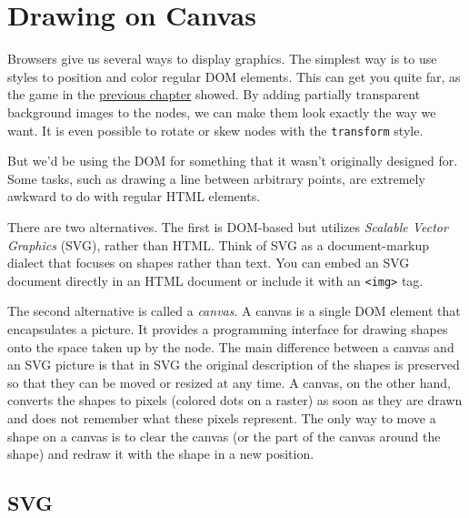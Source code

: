 \chapter{Drawing on Canvas}\label{canvas}


Browsers give us several ways to display graphics. The simplest way is to use styles to position and color regular DOM elements. This can get you quite far, as the game in the \hyperref[game]{previous chapter} showed. By adding partially transparent background images to the nodes, we can make them look exactly the way we want. It is even possible to rotate or skew nodes with the \lstinline`transform` style.

But we'd be using the DOM for something that it wasn't originally designed for. Some tasks, such as drawing a line between arbitrary points, are extremely awkward to do with regular HTML elements.

There are two alternatives. The first is DOM-based but utilizes \emph{Scalable Vector Graphics} (SVG), rather than HTML. Think of SVG as a document-markup dialect that focuses on shapes rather than text. You can embed an SVG document directly in an HTML document or include it with an \lstinline`<img>` tag.

The second alternative is called a \emph{canvas}. A canvas is a single DOM element that encapsulates a picture. It provides a programming interface for drawing shapes onto the space taken up by the node. The main difference between a canvas and an SVG picture is that in SVG the original description of the shapes is preserved so that they can be moved or resized at any time. A canvas, on the other hand, converts the shapes to pixels (colored dots on a raster) as soon as they are drawn and does not remember what these pixels represent. The only way to move a shape on a canvas is to clear the canvas (or the part of the canvas around the shape) and redraw it with the shape in a new position.

\section{SVG}

